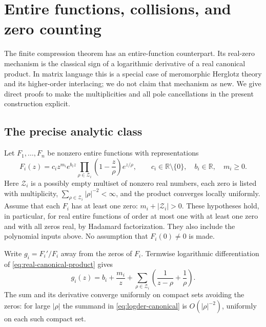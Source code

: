\section{Entire functions, collisions, and zero counting}
\label{sec:entire-graph}

The finite compression theorem has an entire-function counterpart.
Its real-zero mechanism is the classical sign of a logarithmic derivative
of a real canonical product.  In matrix language this is a special case
of meromorphic Herglotz theory and its higher-order interlacing;
we do not claim that mechanism as new.\cite{reiffenstein}
We give direct proofs to make the multiplicities and all pole cancellations
in the present construction explicit.

\subsection{The precise analytic class}

Let $F_1,\ldots,F_n$ be nonzero entire functions with representations
\begin{equation}\label{eq:real-canonical-product}
 F_i(z)=c_i z^{m_i}e^{b_i z}
 \prod_{\rho\in\mathcal Z_i}
 \left(1-\frac z\rho\right)e^{z/\rho},
 \qquad
 c_i\in\mathbb R\setminus\{0\},\quad b_i\in\mathbb R,\quad m_i\geq0.
\end{equation}
Here $\mathcal Z_i$ is a possibly empty multiset of nonzero real numbers,
each zero is listed with multiplicity,
$\sum_{\rho\in\mathcal Z_i}|\rho|^{-2}<\infty$, and the product converges
locally uniformly.  Assume that each $F_i$ has at least one zero:
$m_i+|\mathcal Z_i|>0$.
These hypotheses hold, in particular, for real entire functions of order
at most one with at least one zero and with all zeros real, by Hadamard
factorization.  They also include the polynomial inputs above.
No assumption that $F_i(0)\neq0$ is made.

Write $g_i=F_i'/F_i$ away from the zeros of $F_i$.
Termwise logarithmic differentiation of
\eqref{eq:real-canonical-product} gives
\begin{equation}\label{eq:logder-canonical}
 g_i(z)=b_i+\frac{m_i}{z}
   +\sum_{\rho\in\mathcal Z_i}
       \left(\frac1{z-\rho}+\frac1\rho\right).
\end{equation}
The sum and its derivative converge uniformly on compact sets avoiding
the zeros: for large $|\rho|$ the summand in \eqref{eq:logder-canonical}
is $O(|\rho|^{-2})$, uniformly on each such compact set.

